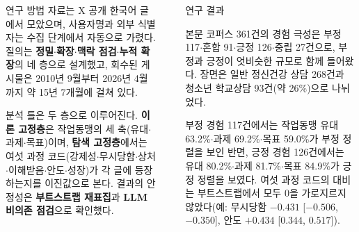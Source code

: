 \documentclass[final]{beamer}
\newlength{\sepwidth}
\newlength{\colwidth}
\newcommand{\separatorcolumn}{\begin{column}{\sepwidth}\end{column}}
\begin{document}
\begin{frame}[t]
\begin{columns}[t]
\begin{column}{\colwidth}
  \begin{block}{연구 방법}
    자료는 X 공개 한국어 글에서 모았으며, 사용자명과 외부 식별자는 수집 단계에서 자동으로 가렸다. 질의는 \textbf{정밀$\cdot$확장$\cdot$맥락 점검$\cdot$누적 확장}의 네 층으로 설계했고, 회수된 게시물은 2010년 9월부터 2026년 4월까지 약 15년 7개월에 걸쳐 있다.

    

    

    분석 틀은 두 층으로 이루어진다. \textbf{이론 고정층}은 작업동맹의 세 축(유대$\cdot$과제$\cdot$목표)이며, \textbf{탐색 고정층}에서는 여섯 과정 코드(강제성$\cdot$무시당함$\cdot$상처$\cdot$이해받음$\cdot$안도$\cdot$성장)가 각 글에 등장하는지를 이진값으로 본다. 결과의 안정성은 \textbf{부트스트랩 재표집}과 \textbf{LLM 비의존 점검}으로 확인했다.
  \end{block}

\end{column}

\separatorcolumn

\begin{column}{\colwidth}

  \begin{block}{연구 결과}

    본문 코퍼스 361건의 경험 극성은 부정 117$\cdot$혼합 91$\cdot$긍정 126$\cdot$중립 27건으로, 부정과 긍정이 엇비슷한 규모로 함께 들어왔다. 장면은 일반 정신건강 상담 268건과 청소년 학교상담 93건(약 26\%)으로 나뉘었다.
    

    

    부정 경험 117건에서는 작업동맹 유대 63.2\%$\cdot$과제 69.2\%$\cdot$목표 59.0\%가 부정 정렬을 보인 반면, 긍정 경험 126건에서는 유대 80.2\%$\cdot$과제 81.7\%$\cdot$목표 84.9\%가 긍정 정렬을 보였다. 여섯 과정 코드의 대비는 부트스트랩에서 모두 0을 가로지르지 않았다(예: 무시당함 $-0.431$ [$-0.506$, $-0.350$], 안도 $+0.434$ [$0.344$, $0.517$]).
    

  \end{block}


\end{column}
\end{columns}
\end{frame}
\end{document}
